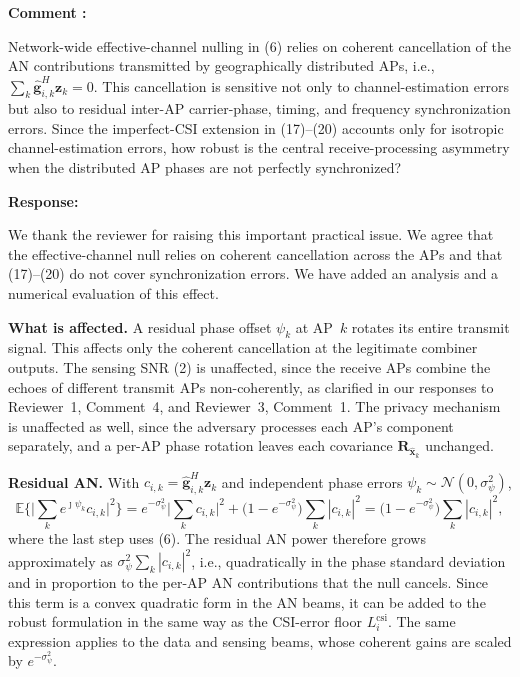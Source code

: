 \documentclass[a4paper,12pt]{article}
\newcounter{reviewcomment}
\newenvironment{reviewcomment}{%
  \stepcounter{reviewcomment}%
  \begin{shaded}
  \textbf{Comment \thereviewcomment:}\par
}{\end{shaded}}
\newenvironment{response}{\par\textbf{Response:}\par}{\par}
\begin{document}
\begin{reviewcomment}
Network-wide effective-channel nulling in (6) relies on coherent
cancellation of the AN contributions transmitted by geographically
distributed APs, i.e., $\sum_k\widehat{\mathbf g}_{i,k}^H\mathbf z_k=0$.
This cancellation is sensitive not only to channel-estimation errors but
also to residual inter-AP carrier-phase, timing, and frequency
synchronization errors. Since the imperfect-CSI extension in (17)--(20)
accounts only for isotropic channel-estimation errors, how robust is the
central receive-processing asymmetry when the distributed AP phases are not
perfectly synchronized?
\end{reviewcomment}
\begin{response}
We thank the reviewer for raising this important practical issue. We agree
that the effective-channel null relies on coherent cancellation across the
APs and that (17)--(20) do not cover synchronization errors. We have added
an analysis and a numerical evaluation of this effect.

\textbf{What is affected.} A residual phase offset $\psi_k$ at AP~$k$
rotates its entire transmit signal. This affects only the coherent
cancellation at the legitimate combiner outputs. The sensing SNR (2) is
unaffected, since the receive APs combine the echoes of different transmit
APs non-coherently, as clarified in our responses to Reviewer~1, Comment~4,
and Reviewer~3, Comment~1. The privacy mechanism is unaffected as well,
since the adversary processes each AP's component separately, and a
per-AP phase rotation leaves each covariance
$\mathbf{R}_{\widehat{\mathbf{x}}_k}$ unchanged.

\textbf{Residual AN.} With $c_{i,k}=\widehat{\mathbf{g}}_{i,k}^H\mathbf{z}_k$
and independent phase errors $\psi_k\sim\mathcal{N}(0,\sigma_\psi^2)$,
\begin{equation*}
\mathbb{E}\Big\{\Big|{\textstyle\sum_k}e^{\jmath\psi_k}c_{i,k}\Big|^2\Big\}
=e^{-\sigma_\psi^2}\Big|{\textstyle\sum_k}c_{i,k}\Big|^2
+\big(1-e^{-\sigma_\psi^2}\big){\textstyle\sum_k}|c_{i,k}|^2
=\big(1-e^{-\sigma_\psi^2}\big){\textstyle\sum_k}|c_{i,k}|^2,
\end{equation*}
where the last step uses (6). The residual AN power therefore grows
approximately as $\sigma_\psi^2\sum_k|c_{i,k}|^2$, i.e., quadratically in the
phase standard deviation and in proportion to the per-AP AN contributions
that the null cancels. Since this term is a convex quadratic form in the AN
beams, it can be added to the robust formulation in the same way as the
CSI-error floor $L_i^{\mathrm{csi}}$. The same expression applies to the
data and sensing beams, whose coherent gains are scaled by
$e^{-\sigma_\psi^2}$.


\end{response}
\end{document}
